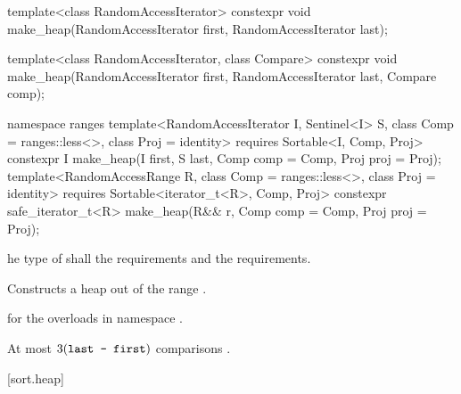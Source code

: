 %
\begin{itemdecl}
template<class RandomAccessIterator>
  constexpr void make_heap(RandomAccessIterator first, RandomAccessIterator last);

template<class RandomAccessIterator, class Compare>
  constexpr void make_heap(RandomAccessIterator first, RandomAccessIterator last,
                           Compare comp);
\end{itemdecl}
\begin{addedblock}
\begin{itemdecl}
namespace ranges {
  template<RandomAccessIterator I, Sentinel<I> S, class Comp = ranges::less<>,
      class Proj = identity>
    requires Sortable<I, Comp, Proj>
    constexpr I
      make_heap(I first, S last, Comp comp = Comp{}, Proj proj = Proj{});
  template<RandomAccessRange R, class Comp = ranges::less<>, class Proj = identity>
    requires Sortable<iterator_t<R>, Comp, Proj>
    constexpr safe_iterator_t<R>
      make_heap(R&& r, Comp comp = Comp{}, Proj proj = Proj{});
}
\end{itemdecl}
\end{addedblock}

\begin{itemdescr}
\pnum
\requires
{}he type of
 shall 
the  requirements
and the  requirements.

\pnum
\effects
Constructs a heap out of the range
.

\begin{addedblock}
\pnum
\returns
{} for the overloads in namespace .
\end{addedblock}

\pnum
\complexity
At most
$3(\texttt{last - first})$
comparisons .
\end{itemdescr}


[sort.heap]{}


